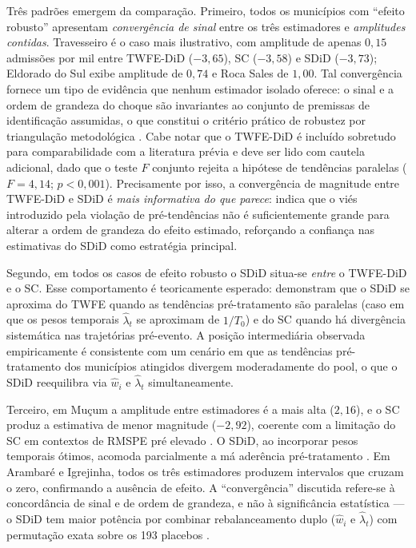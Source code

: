 \documentclass[a4paper,12pt]{article}
\begin{document}
Três padrões emergem da comparação. Primeiro, todos os municípios com
``efeito robusto'' apresentam \emph{convergência de sinal} entre os três
estimadores e \emph{amplitudes contidas}. Travesseiro é o caso mais ilustrativo,
com amplitude de apenas $0{,}15$ admissões por mil entre TWFE-DiD ($-3{,}65$),
SC ($-3{,}58$) e SDiD ($-3{,}73$); Eldorado do Sul exibe amplitude de $0{,}74$
e Roca Sales de $1{,}00$. Tal convergência fornece um tipo de evidência que
nenhum estimador isolado oferece: o sinal e a ordem de grandeza do choque
são invariantes ao conjunto de premissas de identificação assumidas, o que
constitui o critério prático de robustez por triangulação metodológica
\cite{abadie2021, chaisemartin2020}. Cabe notar que o TWFE-DiD é incluído
sobretudo para comparabilidade com a literatura prévia \cite{teixeira2024}
e deve ser lido com cautela adicional, dado que o teste $F$ conjunto rejeita
a hipótese de tendências paralelas ($F=4{,}14$; $p<0{,}001$). Precisamente
por isso, a convergência de magnitude entre TWFE-DiD e SDiD é
\emph{mais informativa do que parece}: indica que o viés introduzido pela
violação de pré-tendências não é suficientemente grande para alterar a
ordem de grandeza do efeito estimado, reforçando a confiança nas
estimativas do SDiD como estratégia principal.

Segundo, em todos os casos de efeito robusto o SDiD situa-se \emph{entre} o
TWFE-DiD e o SC. Esse comportamento é teoricamente esperado:
 demonstram que o SDiD se aproxima do TWFE
quando as tendências pré-tratamento são paralelas (caso em que os pesos
temporais $\hat{\lambda}_t$ se aproximam de $1/T_0$) e do SC quando há
divergência sistemática nas trajetórias pré-evento. A posição intermediária
observada empiricamente é consistente com um cenário em que as tendências
pré-tratamento dos municípios atingidos divergem moderadamente do pool, o que
o SDiD reequilibra via $\hat{w}_i$ e $\hat{\lambda}_t$ simultaneamente.

Terceiro, em Mu\c{c}um a amplitude entre estimadores é a mais alta ($2{,}16$),
e o SC produz a estimativa de menor magnitude ($-2{,}92$), coerente com a limitação do SC em
contextos de RMSPE pré elevado \cite{abadie2010}. O SDiD, ao incorporar pesos temporais ótimos,
acomoda parcialmente a má aderência pré-tratamento \cite{arkhangelsky2021}.
Em Arambaré e Igrejinha, todos os três estimadores produzem intervalos que
cruzam o zero, confirmando a ausência de efeito. A ``convergência'' discutida
refere-se à concordância de sinal e de ordem de grandeza, e não à significância
estatística — o SDiD tem maior potência por combinar rebalanceamento duplo
($\hat{w}_i$ e $\hat{\lambda}_t$) com permutação exata sobre os 193 placebos
\cite{arkhangelsky2021}.
\end{document}
